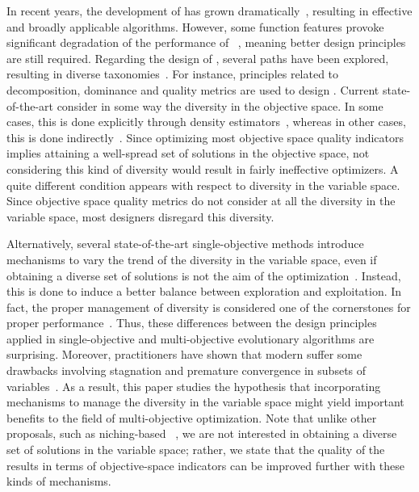 %
In recent years, the development of \MOEAS{} has grown dramatically~\cite{van1998multiobjective, coello2007mop}, resulting 
in effective and broadly applicable algorithms.
%
However, some function features provoke significant degradation of the performance of \MOEAS{}~\cite{huband2006review}, 
meaning better design principles are still required.
%
Regarding the design of \MOEAS{}, several paths have been explored, resulting in diverse taxonomies~\cite{trivedi2016survey}.
%
For instance, principles related to decomposition, dominance and quality metrics are used
to design \MOEAS{}.
%
Current state-of-the-art \MOEAS{} consider in some way the diversity in the objective space.
%
In some cases, this is done explicitly through density estimators~\cite{beume:07}, %
whereas in other cases,
this is done indirectly~\cite{zhang2007moea}. 
%
Since optimizing most objective space quality indicators implies attaining a well-spread set of solutions in the
objective space, not considering this kind of diversity would result in fairly ineffective optimizers.
%
A quite different condition appears with respect to diversity in the variable space.
%
Since objective space quality metrics do not consider at all the diversity in the variable space,
most \MOEA{} designers disregard this diversity.

Alternatively, %
several state-of-the-art single-objective methods introduce mechanisms to vary the trend of the 
diversity in the variable space, even if obtaining a diverse
set of solutions is not the aim of the optimization~\cite{Joel:Crepinsek}.
%
Instead, this is done to induce a better balance between exploration and exploitation.
%
In fact, the proper management of diversity is considered one of the cornerstones for proper performance~\cite{Herrera-Poyatos:17}.
%
Thus, these differences between the design principles applied in single-objective and multi-objective evolutionary 
algorithms are surprising.
%
Moreover, practitioners have shown that modern \MOEAS{} suffer some drawbacks involving stagnation and premature 
convergence in subsets of variables~\cite{ishibuchi2006comparison, castillo2017multi, buche2003self, lu2002dynamic}.
%
As a result, this paper studies the hypothesis that incorporating mechanisms to manage the diversity in the variable space 
might yield important benefits to the field of multi-objective optimization.
%
Note that unlike other proposals, such as niching-based \MOEAS{}~\cite{mahfoud1995niching, srinivas1994muiltiobjective}, we are not interested in obtaining
a diverse set of solutions in the variable space; rather, we state that the quality of the results in terms of objective-space indicators can be improved further with these
kinds of mechanisms.

